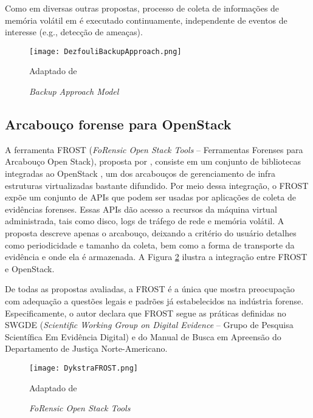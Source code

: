 Como em diversas outras propostas, processo de coleta de informações de memória volátil em \cite{DezfouliBackupApproach:2012} é executado continuamente, independente de eventos de interesse (e.g., detecção de ameaças).
%


\begin{figure}[htb!]
\footnotesize
\caption{\textit{Backup Approach Model}}
\texttt{[image: DezfouliBackupApproach.png]}
\centering
\label{fig:DezfouliBackupApproach}
\begin{center}
Adaptado de \cite{DezfouliBackupApproach:2012} 
\end{center}
\end{figure}


\subsection{Arcabouço forense para OpenStack}
\label{sec:frost}

A ferramenta FROST (\textit{FoRensic Open Stack Tools} -- Ferramentas Forenses para Arcabouço Open Stack), proposta por \cite{DykstraFROST:2013}, consiste em um conjunto de bibliotecas integradas ao OpenStack , um dos arcabouços de gerenciamento de infra estruturas virtualizadas bastante difundido.
%
Por meio dessa integração, o FROST expõe um conjunto de APIs que podem ser usadas por aplicações de coleta de evidências forenses.
%
Essas APIs dão acesso a recursos da máquina virtual administrada, tais como disco, logs de tráfego de rede e memória volátil.
%
A proposta descreve apenas o arcabouço, deixando a critério do usuário detalhes como periodicidade e tamanho da coleta, bem como a forma de transporte da evidência e onde ela é armazenada.
%
A Figura \ref{fig:DykstraFROST} ilustra a integração entre FROST e OpenStack.

De todas as propostas avaliadas, a FROST é a única que mostra preocupação com adequação a questões legais e padrões já estabelecidos na indústria forense.
%
Especificamente, o autor declara que FROST segue as práticas definidas no SWGDE (\textit{Scientific Working Group on Digital Evidence} -- Grupo de Pesquisa Scientífica Em Evidência Digital) e do Manual de Busca em Apreensão do Departamento de Justiça Norte-Americano.
%


\begin{figure}[htb!]
\footnotesize
\caption{\textit{FoRensic Open Stack Tools}}
\texttt{[image: DykstraFROST.png]}
\centering
\label{fig:DykstraFROST}
\begin{center}
Adaptado de \cite{DykstraFROST:2013} 
\end{center}
\end{figure}
%


